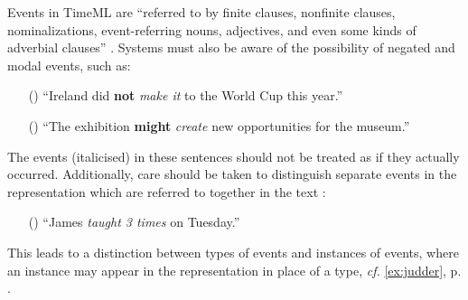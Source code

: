 \documentclass[a4paper,12pt,leqno,twoside]{article}
\newcommand{\ipp}{(\refstepcounter{equation}\theequation)}
\begin{document}
Events in TimeML are ``referred to by finite clauses, nonfinite clauses, nominalizations, event-referring nouns, adjectives, and even some kinds of adverbial clauses'' \citep[p. 133]{Pustejovsky2005}. Systems must also be aware of the possibility of negated and modal events, such as:
\begin{itemize}
	\item[\ipp] ``Ireland did \textbf{not} \textit{make it} to the World Cup this year.''
	\item[\ipp] ``The exhibition \textbf{might} \textit{create} new opportunities for the museum.''
\end{itemize}
The events (italicised) in these sentences should not be treated as if they actually occurred. Additionally, care should be taken to distinguish separate events in the representation which are referred to together in the text \citep[p. 134, (32a.)]{Pustejovsky2005}:
\begin{itemize}
	\item[\ipp\label{other:pustejovsky-type-instance}] ``James \textit{taught 3 times} on Tuesday.''
\end{itemize}
This leads to a distinction between types of events and instances of events, where an instance may appear in the representation in place of a type, \textit{cf.} \cref{ex:judder}, p. \pageref{ex:judder}.
\end{document}

